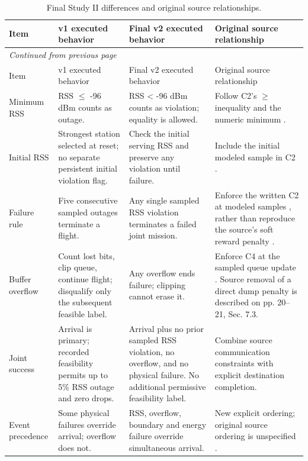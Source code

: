 {\footnotesize\setlength{\tabcolsep}{3pt}
\begin{longtable}{@{}p{}p{}p{}p{}@{}}
\caption{Final Study II differences and original source relationships.}\label{tab:v2changes}\\
\toprule Item & v1 executed behavior & Final v2 executed behavior & Original source relationship\\\midrule
\endfirsthead
\multicolumn{4}{l}{\textit{Continued from previous page}}\\\toprule
Item & v1 executed behavior & Final v2 executed behavior & Original source relationship\\\midrule
\endhead
\bottomrule\endfoot
Minimum RSS & RSS $\leq$ -96 dBm counts as outage. & RSS < -96 dBm counts as violation; equality is allowed. & Follow C2's $\geq$ inequality \cite[p. 11, Eq. (12)]{thesis} and the numeric minimum \cite[p. 15, Table 3]{thesis}.\\
Initial RSS & Strongest station selected at reset; no separate persistent initial violation flag. & Check the initial serving RSS and preserve any violation until failure. & Include the initial modeled sample in C2 \cite[p. 11]{thesis}.\\
Failure rule & Five consecutive sampled outages terminate a flight. & Any single sampled RSS violation terminates a failed joint mission. & Enforce the written C2 at modeled samples \cite[p. 11]{thesis}, rather than reproduce the source's soft reward penalty \cite[p. 12, Eq. (14)]{thesis}.\\
Buffer overflow & Count lost bits, clip queue, continue flight; disqualify only the subsequent feasible label. & Any overflow ends failure; clipping cannot erase it. & Enforce C4 at the sampled queue update \cite[p. 11, Eq. (12)]{thesis}. Source removal of a direct dump penalty is described on pp. 20--21, Sec. 7.3.\\
Joint success & Arrival is primary; recorded feasibility permits up to 5\% RSS outage and zero drops. & Arrival plus no prior sampled RSS violation, no overflow, and no physical failure. No additional permissive feasibility label. & Combine source communication constraints \cite[p. 11]{thesis} with explicit destination completion.\\
Event precedence & Some physical failures override arrival; overflow does not. & RSS, overflow, boundary and energy failure override simultaneous arrival. & New explicit ordering; original source ordering is unspecified \cite[p. 12, Sec. 5.2]{thesis}.\\

\end{longtable}}
